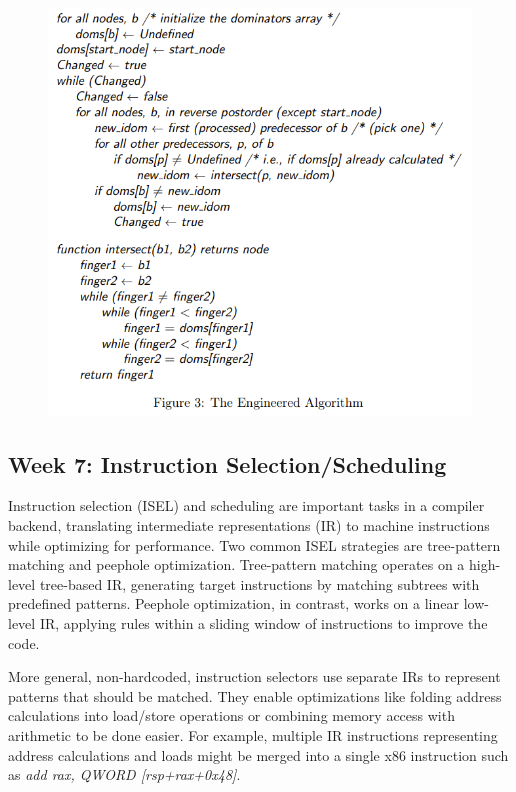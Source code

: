 \documentclass[11pt, a4paper, titlepage]{article}
\begin{document}
\begin{figure}[H]
  \centering
  \includegraphics[scale=0.45]{images/r11.png}
\end{figure}

\subsection{Week 7: Instruction Selection/Scheduling}

Instruction selection (ISEL) and scheduling are important tasks in a compiler backend, translating intermediate representations (IR) to machine instructions while optimizing for performance. Two common ISEL strategies are tree-pattern matching and peephole optimization. Tree-pattern matching operates on a high-level tree-based IR, generating target instructions by matching subtrees with predefined patterns. Peephole optimization, in contrast, works on a linear low-level IR, applying rules within a sliding window of instructions to improve the code.

More general, non-hardcoded, instruction selectors use separate IRs to represent patterns that should be matched. They enable optimizations like folding address calculations into load/store operations or combining memory access with arithmetic to be done easier. For example, multiple IR instructions representing address calculations and loads might be merged into a single x86 instruction such as \textit{add rax, QWORD [rsp+rax+0x48]}. 
\end{document}
